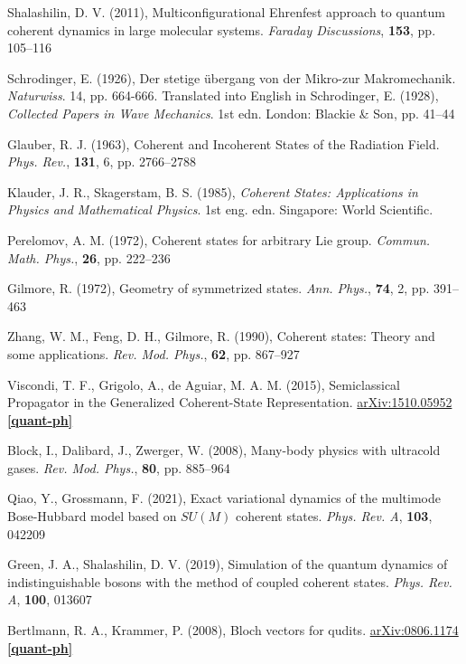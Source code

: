 \documentclass[12pt]{article}
\begin{document}
	
	\begin{thebibliography}{10}

	Shalashilin, D. V. (2011), Multiconfigurational Ehrenfest approach to quantum coherent dynamics in large molecular systems. \textit{Faraday Discussions}, \textbf{153}, pp. 105--116
	
	Schrodinger, E. (1926), Der stetige übergang von der Mikro-zur Makromechanik. \textit{Naturwiss}. 14, pp. 664-666. Translated into English in Schrodinger, E. (1928), \textit{Collected Papers in Wave Mechanics}. 1st edn. London: Blackie \& Son, pp. 41--44
	
	Glauber, R. J. (1963), Coherent and Incoherent States of the Radiation Field. \textit{Phys. Rev.}, \textbf{131}, 6, pp. 2766--2788
	
	Klauder, J. R., Skagerstam, B. S. (1985), \textit{Coherent States: Applications in Physics and Mathematical Physics}. 1st eng. edn. Singapore: World Scientific.
	
	Perelomov, A. M. (1972), Coherent states for arbitrary Lie group. \textit{Commun. Math. Phys.}, \textbf{26}, pp. 222--236
	
	Gilmore, R. (1972), Geometry of symmetrized states. \textit{Ann. Phys.}, \textbf{74}, 2, pp. 391--463
	
	Zhang, W. M., Feng, D. H., Gilmore, R. (1990), Coherent states: Theory and some applications. \textit{Rev. Mod. Phys.}, \textbf{62}, pp. 867--927
	
	Viscondi, T. F., Grigolo, A., de Aguiar, M. A. M. (2015), Semiclassical Propagator in the Generalized Coherent-State Representation. \href{https://doi.org/10.48550/arXiv.1510.05952}{arXiv:1510.05952 \textbf{[quant-ph]}}
	
	Block, I., Dalibard, J., Zwerger, W. (2008), Many-body physics with ultracold gases. \textit{Rev. Mod. Phys.}, \textbf{80}, pp. 885--964
	
	Qiao, Y., Grossmann, F. (2021), Exact variational dynamics of the multimode Bose-Hubbard model based on $SU(M)$ coherent states. \textit{Phys. Rev. A}, \textbf{103}, 042209
	
	Green, J. A., Shalashilin, D. V. (2019), Simulation of the quantum dynamics of indistinguishable bosons with the method of coupled coherent states. \textit{Phys. Rev. A}, \textbf{100}, 013607
	
	Bertlmann, R. A., Krammer, P. (2008), Bloch vectors for qudits. \href{ 	
https://doi.org/10.48550/arXiv.0806.1174}{arXiv:0806.1174 \textbf{[quant-ph]}}

	\end{thebibliography}
	
	
	
	
	

	
	
\end{document}

